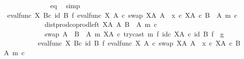 \begin{isabellebody}
\ \ \ \ \ \ \ \ \ \ \ \ \isamarkupfalse%
\ eq\ \isamarkupfalse%
\ simp\isanewline
\ \ \ \ \ \ \ \ \ \ \isamarkupfalse%
\ \isamarkupfalse%
\ {\isachardoublequoteopen}{\isacharparenleft}{\kern0pt}eval{\isacharunderscore}{\kern0pt}func\ X\ B{\isacharparenright}{\kern0pt}{\isasymcirc}\isactrlsub c\ {\isacharparenleft}{\kern0pt}id\ B\ {\isasymtimes}\isactrlsub f\ {\isacharparenleft}{\kern0pt}{\isacharparenleft}{\kern0pt}{\isacharparenleft}{\kern0pt}eval{\isacharunderscore}{\kern0pt}func\ X\ A\ {\isasymcirc}\isactrlsub c\ swap\ {\isacharparenleft}{\kern0pt}X\isactrlbsup A\isactrlesup {\isacharparenright}{\kern0pt}\ A{\isacharparenright}{\kern0pt}\ {\isasymamalg}\ {\isacharparenleft}{\kern0pt}x\ {\isasymcirc}\isactrlsub c\ {\isasymbeta}\isactrlbsub X\isactrlbsup A\isactrlesup \ {\isasymtimes}\isactrlsub c\ {\isacharparenleft}{\kern0pt}B\ {\isasymsetminus}\ {\isacharparenleft}{\kern0pt}A{\isacharcomma}{\kern0pt}\ m{\isacharparenright}{\kern0pt}{\isacharparenright}{\kern0pt}\isactrlesub {\isacharparenright}{\kern0pt}\ {\isasymcirc}\isactrlsub c\isanewline
\ \ \ \ \ \ \ \ \ \ \ \ dist{\isacharunderscore}{\kern0pt}prod{\isacharunderscore}{\kern0pt}coprod{\isacharunderscore}{\kern0pt}left\ {\isacharparenleft}{\kern0pt}X\isactrlbsup A\isactrlesup {\isacharparenright}{\kern0pt}\ A\ {\isacharparenleft}{\kern0pt}B\ {\isasymsetminus}\ {\isacharparenleft}{\kern0pt}A{\isacharcomma}{\kern0pt}\ m{\isacharparenright}{\kern0pt}{\isacharparenright}{\kern0pt}\ {\isasymcirc}\isactrlsub c\isanewline
\ \ \ \ \ \ \ \ \ \ \ \ swap\ {\isacharparenleft}{\kern0pt}A\ {\isasymCoprod}\ {\isacharparenleft}{\kern0pt}B\ {\isasymsetminus}\ {\isacharparenleft}{\kern0pt}A{\isacharcomma}{\kern0pt}\ m{\isacharparenright}{\kern0pt}{\isacharparenright}{\kern0pt}{\isacharparenright}{\kern0pt}\ {\isacharparenleft}{\kern0pt}X\isactrlbsup A\isactrlesup {\isacharparenright}{\kern0pt}\ {\isasymcirc}\isactrlsub c\ try{\isacharunderscore}{\kern0pt}cast\ m\ {\isasymtimes}\isactrlsub f\ id\isactrlsub c\ {\isacharparenleft}{\kern0pt}X\isactrlbsup A\isactrlesup {\isacharparenright}{\kern0pt}{\isacharparenright}{\kern0pt}\isactrlsup {\isasymsharp}{\isacharparenright}{\kern0pt}{\isacharparenright}{\kern0pt}\ {\isasymcirc}\isactrlsub c\ {\isacharparenleft}{\kern0pt}id\ B\ {\isasymtimes}\isactrlsub f\ \ g{\isacharparenright}{\kern0pt}\ {\isacharequal}{\kern0pt}\ \isanewline
\ \ \ \ \ \ \ \ \ \ {\isacharparenleft}{\kern0pt}eval{\isacharunderscore}{\kern0pt}func\ X\ B{\isacharparenright}{\kern0pt}{\isasymcirc}\isactrlsub c\ {\isacharparenleft}{\kern0pt}id\ B\ {\isasymtimes}\isactrlsub f\ {\isacharparenleft}{\kern0pt}{\isacharparenleft}{\kern0pt}{\isacharparenleft}{\kern0pt}eval{\isacharunderscore}{\kern0pt}func\ X\ A\ {\isasymcirc}\isactrlsub c\ swap\ {\isacharparenleft}{\kern0pt}X\isactrlbsup A\isactrlesup {\isacharparenright}{\kern0pt}\ A{\isacharparenright}{\kern0pt}\ {\isasymamalg}\ {\isacharparenleft}{\kern0pt}x\ {\isasymcirc}\isactrlsub c\ {\isasymbeta}\isactrlbsub X\isactrlbsup A\isactrlesup \ {\isasymtimes}\isactrlsub c\ {\isacharparenleft}{\kern0pt}B\ {\isasymsetminus}\ {\isacharparenleft}{\kern0pt}A{\isacharcomma}{\kern0pt}\ m{\isacharparenright}{\kern0pt}{\isacharparenright}{\kern0pt}\isactrlesub {\isacharparenright}{\kern0pt}\ {\isasymcirc}\isactrlsub c\isanewline

\end{isabellebody}
